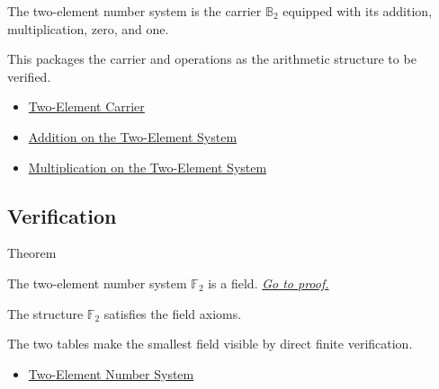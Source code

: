 \begin{remark*}
The two-element number system is the carrier \(\mathbb{B}_2\) equipped with its addition, multiplication, zero, and one.
\end{remark*}

\begin{remark*}[Interpretation]
This packages the carrier and operations as the arithmetic structure to be verified.
\end{remark*}

\begin{dependencies}
\begin{itemize}
  \item \hyperref[def:two-element-carrier]{Two-Element Carrier}
  \item \hyperref[def:addition-on-two-element-system]{Addition on the Two-Element System}
  \item \hyperref[def:multiplication-on-two-element-system]{Multiplication on the Two-Element System}
\end{itemize}
\end{dependencies}

\subsection*{Verification}

\begin{theorembox}{Theorem}
\begin{theorem}
\label{thm:two-element-system-is-field}
The two-element number system \(\mathbb{F}_2\) is a field.
\hyperref[prf:two-element-system-is-field]{\textit{Go to proof.}}
\end{theorem}
\end{theorembox}

\begin{remark*}
The structure \(\mathbb{F}_2\) satisfies the field axioms.
\end{remark*}

\begin{remark*}[Interpretation]
The two tables make the smallest field visible by direct finite verification.
\end{remark*}


\begin{dependencies}
\begin{itemize}
  \item \hyperref[def:two-element-number-system]{Two-Element Number System}
\end{itemize}
\end{dependencies}

